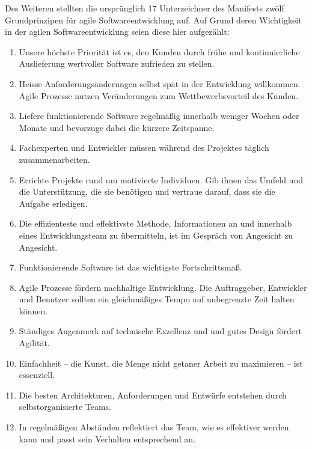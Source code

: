 Des Weiteren stellten die ursprünglich 17 Unterzeichner des Manifests zwölf Grundprinzipen für agile Softwareentwicklung auf. \cite{bib:eckstein} Auf Grund deren Wichtigkeit in der agilen Softwareentwicklung seien diese hier aufgezählt:
\begin{enumerate}
	\item Unsere höchste Priorität ist es, den Kunden durch frühe und kontinuierliche Auslieferung wertvoller Software zufrieden zu stellen.
	\item Heisse Anforderungsänderungen selbst spät in der Entwicklung willkommen. Agile Prozesse nutzen Veränderungen zum Wettbewerbsvorteil des Kunden.
	\item Liefere funktionierende Software regelmäßig innerhalb weniger Wochen oder Monate und bevorzuge dabei die kürzere Zeitspanne.
	\item Fachexperten und Entwickler müssen während des Projektes täglich zusammenarbeiten.
	\item Errichte Projekte rund um motivierte Individuen. Gib ihnen das Umfeld und die Unterstützung, die sie benötigen und vertraue darauf, dass sie die Aufgabe erledigen.
	\item Die effizienteste und effektivste Methode, Informationen an und innerhalb eines Entwicklungsteam zu übermitteln, ist im Gespräch von Angesicht zu Angesicht.
	\item Funktionierende Software ist das wichtigste Fortschrittsmaß.
	\item Agile Prozesse fördern nachhaltige Entwicklung. Die Auftraggeber, Entwickler und Benutzer sollten ein gleichmäßiges Tempo auf unbegrenzte Zeit halten können.
	\item Ständiges Augenmerk auf technische Exzellenz und und gutes Design fördert Agilität.
	\item Einfachheit -- die Kunst, die Menge nicht getaner Arbeit zu maximieren -- ist essenziell.
	\item Die besten Architekturen, Anforderungen und Entwürfe entstehen durch selbstorganisierte Teams.
	\item In regelmäßigen Abständen reflektiert das Team, wie es effektiver werden kann und passt sein Verhalten entsprechend an.
\end{enumerate}